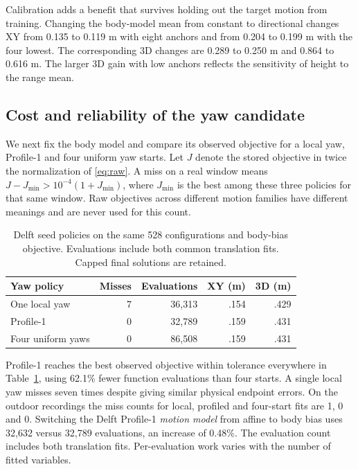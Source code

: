 \documentclass{IEEEtaes}
\begin{document}
Calibration adds a benefit that survives holding out the target motion from training. Changing the body-model mean from constant to directional changes XY from 0.135 to 0.119 m with eight anchors and from 0.204 to 0.199 m with the four lowest. The corresponding 3D changes are 0.289 to 0.250 m and 0.864 to 0.616 m. The larger 3D gain with low anchors reflects the sensitivity of height to the range mean.

\subsection{Cost and reliability of the yaw candidate}
We next fix the body model and compare its observed objective for a local yaw, Profile-1 and four uniform yaw starts. Let \(J\) denote the stored objective in twice the normalization of \eqref{eq:raw}. A miss on a real window means \(J-J_{\min}>10^{-4}(1+J_{\min})\), where \(J_{\min}\) is the best among these three policies for that same window. Raw objectives across different motion families have different meanings and are never used for this count.

\begin{table}[t]
\caption{Delft seed policies on the same 528 configurations and body-bias objective. Evaluations include both common translation fits. Capped final solutions are retained.}
\label{tab:seed}\centering\tablefont
\begin{tabular}{@{}lrrrr@{}}
\toprule
Yaw policy&Misses&Evaluations&XY (m)&3D (m)\\\midrule
One local yaw&7&36,313&.154&.429\\
Profile-1&0&32,789&.159&.431\\
Four uniform yaws&0&86,508&.159&.431\\\bottomrule
\end{tabular}
\end{table}

Profile-1 reaches the best observed objective within tolerance everywhere in Table~\ref{tab:seed}, using 62.1\% fewer function evaluations than four starts. A single local yaw misses seven times despite giving similar physical endpoint errors. On the outdoor recordings the miss counts for local, profiled and four-start fits are 1, 0 and 0. Switching the Delft Profile-1 \emph{motion model} from affine to body bias uses 32,632 versus 32,789 evaluations, an increase of 0.48\%. The evaluation count includes both translation fits. Per-evaluation work varies with the number of fitted variables.
\end{document}
